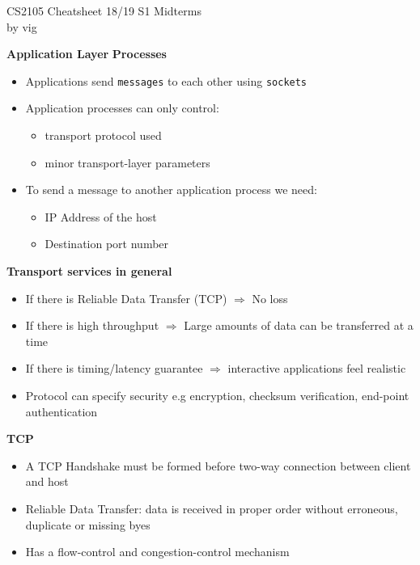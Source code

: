 \documentclass[a4paper]{article} \usepackage[backend=biber, style=numeric, sorting=none]{biblatex}
\begin{document}
\setlength\parindent{0pt} %
\scriptsize
{}

\begin{center}
{\large CS2105 Cheatsheet 18/19 S1 Midterms}\\{by vig}
\end{center}
    \begin{multicols*}{4}

{\small\textbf{Application Layer}}
\textbf{Processes}
\begin{itemize}[leftmargin=*]
\itemsep -0.5em
\item Applications send \texttt{messages} to each other using \texttt{sockets}
\item Application processes can only control:
  \begin{itemize}[leftmargin=*]
  \item transport protocol used
  \item minor transport-layer parameters
  \end{itemize}
\item To send a message to another application process we need:
  \begin{itemize}[leftmargin=*]
  \item IP Address of the host
  \item Destination port number
  \end{itemize}
\end{itemize}

\textbf{Transport services in general}
\begin{itemize}[leftmargin=*]
\item If there is Reliable Data Transfer (TCP) $\Rightarrow$ No loss
\item If there is high throughput $\Rightarrow$ Large amounts of data can be transferred at a time
\item If there is timing/latency guarantee $\Rightarrow$ interactive applications feel realistic
\item Protocol can specify security e.g encryption, checksum verification, end-point authentication
\end{itemize}

\textbf{TCP}
\begin{itemize}[leftmargin=*]
\item A TCP Handshake must be formed before two-way connection between client and host
\item Reliable Data Transfer: data is received in proper order without erroneous, duplicate or missing byes
\item Has a flow-control and congestion-control mechanism
\end{itemize}


\end{multicols*}
\end{document}
